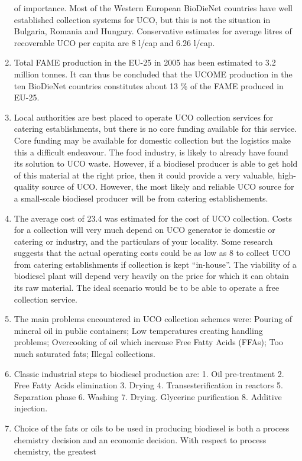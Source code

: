 \documentclass[11pt,fleqn]{book} %
\begin{document}
\begin{enumerate}
	of importance. Most of the Western European BioDieNet countries have well established
	collection systems for UCO, but this is not the situation in Bulgaria, Romania and
	Hungary. Conservative estimates for average litres of recoverable UCO per capita are 8
	l/cap and 6.26 l/cap.
	\item Total FAME production in the EU-25 in 2005 has been estimated to 3.2 million tonnes. It
	can thus be concluded that the UCOME production in the ten BioDieNet countries
	constitutes about 13 \% of the FAME produced in EU-25.
	\item Local authorities are best placed to operate UCO collection services for catering
	establishments, but there is no core funding available for this service. Core funding may
	be available for domestic collection but the logistics make this a difficult endeavour. The
	food industry, is likely to already have found its solution to UCO waste. However, if a
	biodiesel producer is able to get hold of this material at the right price, then it could
	provide a very valuable, high-quality source of UCO. However, the most likely and
	reliable UCO source for a small-scale biodiesel producer will be from catering
	establishements.
	\item The average cost of 23.4 %
	was estimated for the cost of UCO collection. Costs for a
	collection will very much depend on UCO generator ie domestic or catering or industry,
	and the particulars of your locality. Some research suggests that the actual operating
	costs could be as low as 8 %
	to collect UCO from catering establishments if collection is
	kept “in-house”. The viability of a biodiesel plant will depend very heavily on the price for
	which it can obtain its raw material. The ideal scenario would be to be able to operate a
	free collection service.
	\item The main problems encountered in UCO collection schemes were: Pouring of mineral oil
	in public containers; Low temperatures creating handling problems; Overcooking of oil which 
	increase Free Fatty Acids (FFAs); Too much saturated fats; Illegal collections.
	\item Classic industrial steps to biodiesel production are: 1. Oil pre-treatment 2. Free Fatty
	Acids elimination 3. Drying 4. Transesterification in reactors 5. Separation phase 6.
	Washing 7. Drying. Glycerine purification 8. Additive injection.
	\item Choice of the fats or oils to be used in producing biodiesel is both a process chemistry
	decision and an economic decision. With respect to process chemistry, the greatest

\end{enumerate}
\end{document}
